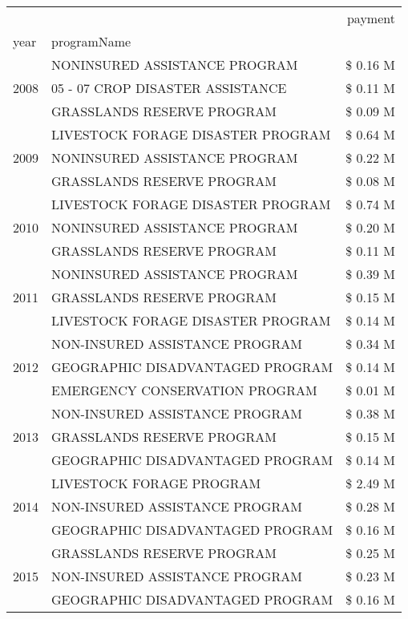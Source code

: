 \begin{tabular}{llr}
\toprule
 &  & payment \\
year & programName &  \\
\midrule
\multirow[t]{3}{*}{2008} & NONINSURED ASSISTANCE PROGRAM & \$ 0.16 M \\
 & 05 - 07 CROP DISASTER ASSISTANCE & \$ 0.11 M \\
 & GRASSLANDS RESERVE PROGRAM & \$ 0.09 M \\
\cline{1-3}
\multirow[t]{3}{*}{2009} & LIVESTOCK FORAGE DISASTER  PROGRAM & \$ 0.64 M \\
 & NONINSURED ASSISTANCE PROGRAM & \$ 0.22 M \\
 & GRASSLANDS RESERVE PROGRAM & \$ 0.08 M \\
\cline{1-3}
\multirow[t]{3}{*}{2010} & LIVESTOCK FORAGE DISASTER  PROGRAM & \$ 0.74 M \\
 & NONINSURED ASSISTANCE PROGRAM & \$ 0.20 M \\
 & GRASSLANDS RESERVE PROGRAM & \$ 0.11 M \\
\cline{1-3}
\multirow[t]{3}{*}{2011} & NONINSURED ASSISTANCE PROGRAM & \$ 0.39 M \\
 & GRASSLANDS RESERVE PROGRAM & \$ 0.15 M \\
 & LIVESTOCK FORAGE DISASTER PROGRAM & \$ 0.14 M \\
\cline{1-3}
\multirow[t]{3}{*}{2012} & NON-INSURED ASSISTANCE PROGRAM & \$ 0.34 M \\
 & GEOGRAPHIC DISADVANTAGED PROGRAM & \$ 0.14 M \\
 & EMERGENCY CONSERVATION PROGRAM & \$ 0.01 M \\
\cline{1-3}
\multirow[t]{3}{*}{2013} & NON-INSURED ASSISTANCE PROGRAM & \$ 0.38 M \\
 & GRASSLANDS RESERVE PROGRAM & \$ 0.15 M \\
 & GEOGRAPHIC DISADVANTAGED PROGRAM & \$ 0.14 M \\
\cline{1-3}
\multirow[t]{3}{*}{2014} & LIVESTOCK FORAGE PROGRAM & \$ 2.49 M \\
 & NON-INSURED ASSISTANCE PROGRAM & \$ 0.28 M \\
 & GEOGRAPHIC DISADVANTAGED PROGRAM & \$ 0.16 M \\
\cline{1-3}
\multirow[t]{3}{*}{2015} & GRASSLANDS RESERVE PROGRAM & \$ 0.25 M \\
 & NON-INSURED ASSISTANCE PROGRAM & \$ 0.23 M \\
 & GEOGRAPHIC DISADVANTAGED PROGRAM & \$ 0.16 M \\

\end{tabular}
